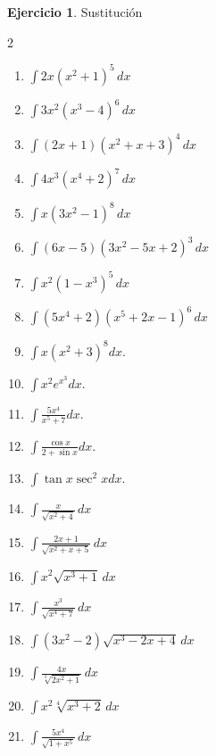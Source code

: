 \documentclass[12pt]{article}
\theoremstyle{definition}
\newtheorem{Ejer}[teorema]{Ejercicio}
\theoremstyle{remark}
\begin{document}
\begin{Ejer} Sustituci\'on
\begin{multicols}{2}
\begin{enumerate}[resume=integrales]
\item $\displaystyle \int 2x(x^2+1)^5\,dx$
\item $\displaystyle \int 3x^2(x^3-4)^6\,dx$
\item $\displaystyle \int(2x+1)(x^2+x+3)^4\,dx$
\item $\displaystyle \int 4x^3(x^4+2)^7\,dx$
\item $\displaystyle \int x(3x^2-1)^8\,dx$
\item $\displaystyle \int(6x-5)(3x^2-5x+2)^3\,dx$
\item $\displaystyle \int x^2(1-x^3)^5\,dx$
\item $\displaystyle \int(5x^4+2)(x^5+2x-1)^6\,dx$
\item $\int x(x^2+3)^8dx$.
\item $\int x^2e^{x^3}dx$.
\item $\int\frac{5x^4}{x^5+7}dx$.
\item $\int\frac{\cos x}{2+\sin x}dx$.
\item $\int\tan x\sec^2x dx$.
\item $\displaystyle \int\frac{x}{\sqrt{x^2+4}}\,dx$
\item $\displaystyle \int\frac{2x+1}{\sqrt{x^2+x+5}}\,dx$
\item $\displaystyle \int x^2\sqrt{x^3+1}\,dx$
\item $\displaystyle \int\frac{x^3}{\sqrt{x^4+7}}\,dx$
\item $\displaystyle \int(3x^2-2)\sqrt{x^3-2x+4}\,dx$
\item $\displaystyle \int\frac{4x}{\sqrt[3]{2x^2+1}}\,dx$
\item $\displaystyle \int x^2\sqrt[4]{x^3+2}\,dx$
\item $\displaystyle \int\frac{5x^4}{\sqrt{1+x^5}}\,dx$
\end{enumerate}
\end{multicols}
\end{Ejer}
\end{document}
